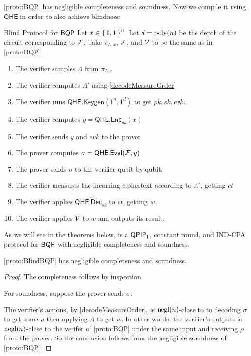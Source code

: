 \cref{proto:BQP} has negligible completeness and soundness.
Now we compile it using $\mathsf{QHE}$ in order to also achieve blindness:

\begin{protocol}{Blind Protocol for $\operatorname{\mathsf{BQP}}$}
	\label{proto:BlindBQP}
	Let $x\in\set{0,1}^n$.
	Let $d=\operatorname*{\operatorname{poly}}(n)$ be the depth of the circuit corresponding to $\mathcal{F}$.
	Take $\pi_{L, x}$, $\mathcal{F}$, and $\mathcal{V}$ to be the same as in \cref{proto:BQP}
	\begin{enumerate}
		\item The verifier samples $\Lambda$ from $\pi_{L, x}$
		\item The verifier computes $\Lambda'$ using \cref{decodeMeasureOrder}
		\item The verifier runs $\mathsf{QHE.Keygen}(1^n, 1^d)$ to get $pk, sk, evk$.
		\item The verifier computes $y=\mathsf{QHE.Enc}_{pk}(x)$
		\item The verifier sends $y$ and $evk$ to the prover
		\item The prover computes $\sigma=\mathsf{QHE.Eval}(\mathcal{F}, y)$
		\item The prover sends $\sigma$ to the verifier qubit-by-qubit.
		\item The verifier measures the incoming ciphertext according to $\Lambda'$, getting $ct$
		\item The verifier applies $\widehat{\mathsf{QHE.Dec}_{sk}}$ to $ct$, getting $w$.
		\item The verifier applies $\mathcal{V}$ to $w$ and outputs its result.
	\end{enumerate}
\end{protocol}

As we will see in the theorems below,  is a $\operatorname{\mathsf{QPIP}}_1$, constant round, and IND-CPA protocol for $\operatorname{\mathsf{BQP}}$ with negligible completeness and soundness.

\begin{thm}
	\cref{proto:BlindBQP} has negligible completeness and soundness.
\end{thm}
\begin{proof}
	The completeness follows by inspection.

	For soundness, suppose the prover sends $\sigma$.

	The verifier's actions, by \cref{decodeMeasureOrder}, is $\operatorname{negl}(n)$-close to to decoding $\sigma$ to get some $\rho$ then applying $\Lambda$ to get $w$.
	In other words, the verifier's outputs is $\operatorname{negl}(n)$-close to the verifer of \cref{proto:BQP} under the same input and receiving $\rho$ from the prover.
	So the conclusion follows from the negligible soundness of \cref{proto:BQP}.
\end{proof}


